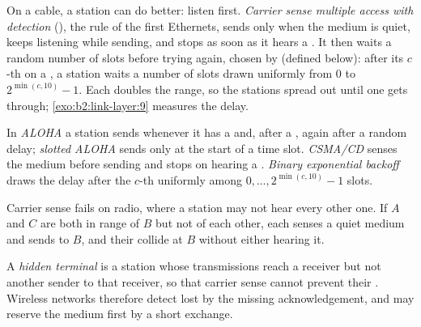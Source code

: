 On a cable, a station can do better: listen first. \emph{Carrier sense multiple access with  detection}
(), the rule of the first Ethernets, sends only when the medium is quiet, keeps listening while sending, and
stops as soon as it hears a . It then waits a random number of slots before trying again, chosen by
 (defined below): after its $c$-th  on a , a station
waits a number of slots drawn uniformly from $0$ to $2^{\min(c,10)} - 1$. Each  doubles the range, so the
stations spread out until one gets through; \cref{exo:b2:link-layer:9} measures the delay.

\begin{definition}\label{def:b2:link-layer:aloha}
In \emph{ALOHA} a station sends whenever it has a  and, after a , again after a random
delay; \emph{slotted ALOHA} sends only at the start of a time slot. \emph{CSMA/CD} senses the medium
before sending and stops on hearing a . \emph{Binary exponential backoff} draws the delay after the $c$-th
 uniformly among $0, \dots, 2^{\min(c,10)} - 1$ slots.
\end{definition}

Carrier sense fails on radio, where a station may not hear every other one. If $A$ and $C$ are both in range of $B$ but
not of each other, each senses a quiet medium and sends to $B$, and their  collide at $B$ without either hearing
it.

\begin{definition}\label{def:b2:link-layer:hidden}
A \emph{hidden terminal} is a station whose transmissions reach a receiver but not another
sender to that receiver, so that carrier sense cannot prevent their . Wireless networks therefore detect
lost  by the missing acknowledgement, and may reserve the medium first by a short exchange.
\end{definition}

